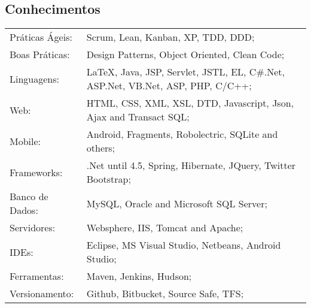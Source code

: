 \documentclass[a4paper, oneside, final]{scrartcl}
\begin{document}
\begin{center}
\section{Conhecimentos}
\begin{tabularx}{1\linewidth}{p{3.5cm}X}
Práticas Ágeis:  & Scrum, Lean, Kanban, XP, TDD, DDD;\\
Boas Práticas:   & Design Patterns, Object Oriented, Clean Code;\\
Linguagens:      & LaTeX, Java, JSP, Servlet, JSTL, EL, C\#.Net, ASP.Net, VB.Net, ASP, PHP, C/C++;\\
Web:             & HTML, CSS, XML, XSL, DTD, Javascript, Json, Ajax and Transact SQL;\\
Mobile:          & Android, Fragments, Robolectric, SQLite and others;\\
Frameworks:      & .Net until 4.5, Spring, Hibernate, JQuery, Twitter Bootstrap;\\
Banco de Dados:  & MySQL, Oracle and Microsoft SQL Server; \\
Servidores:      & Websphere, IIS, Tomcat and Apache;\\
IDEs:            & Eclipse, MS Visual Studio, Netbeans, Android Studio;\\
Ferramentas:     & Maven, Jenkins, Hudson;\\
Versionamento:   & Github, Bitbucket, Source Safe, TFS;\\
\end{tabularx}

\end{center}
\end{document}
